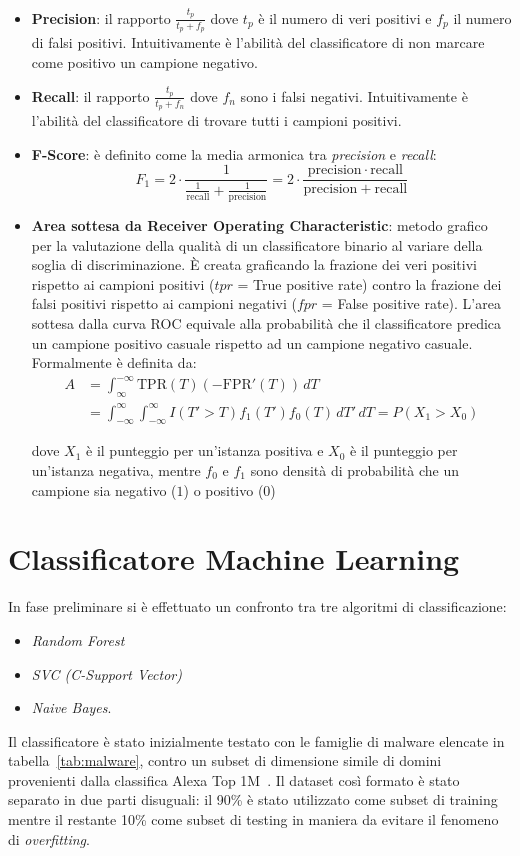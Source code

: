 \begin{itemize}
\item \textbf{Precision}: il rapporto $\frac{t_p}{t_p+f_p}$ dove $t_p$ è il numero di veri positivi e $f_p$ il numero di falsi positivi. Intuitivamente è l'abilità del classificatore di non marcare come positivo un campione negativo.
\item \textbf{Recall}: il rapporto $\frac{t_p}{t_p+f_n}$  dove $f_n$ sono i falsi negativi. Intuitivamente è l'abilità del classificatore di trovare tutti i campioni positivi.
\item \textbf{F-Score}: è definito come la media armonica tra \textit{precision} e \textit{recall}: 
\[F_1 = 2 \cdot \frac{1}{\tfrac{1}{\mathrm{recall}} + \tfrac{1}{\mathrm{precision}}} = 2 \cdot \frac{\mathrm{precision} \cdot \mathrm{recall}}{\mathrm{precision} + \mathrm{recall}}\]
\item \textbf{Area sottesa da Receiver Operating Characteristic}:  metodo grafico per la valutazione della qualità di un classificatore binario al variare della soglia di discriminazione. \`E creata graficando la frazione dei veri positivi rispetto ai campioni positivi ($tpr$ = True positive rate) contro la frazione dei falsi positivi rispetto ai campioni negativi ($fpr$ = False positive rate). L'area sottesa dalla curva ROC equivale alla probabilità che il classificatore predica un campione positivo casuale rispetto ad un campione negativo casuale. Formalmente è definita da:
\begin{align*}
A & = \int_{\infty}^{-\infty} \mbox{TPR}(T) \left(-\mbox{FPR}'(T)\right) \, dT \\
& = \int_{-\infty}^{\infty} \int_{-\infty}^{\infty} I(T'>T)f_1(T') f_0(T) \, dT' \, dT = P(X_1 > X_0)
\end{align*}

dove 
$X_{1}$ è il punteggio per un'istanza positiva e $X_{0}$ è il punteggio per un'istanza negativa, mentre $f_{0}$ e $f_{1}$ sono densità di probabilità che un campione sia negativo ($1$) o positivo ($0$)
\end{itemize}

\newpage
\section{Classificatore Machine Learning}
\label{res:crf}
In fase preliminare si è effettuato un confronto tra tre algoritmi di classificazione: 
\begin{itemize}
\item \textit{Random Forest}
\item \textit{SVC (C-Support Vector)}
\item \textit{Naive Bayes}. 
\end{itemize}
Il classificatore è stato inizialmente testato con le famiglie di malware elencate in tabella~\ref{tab:malware}, contro un subset di dimensione simile di domini provenienti dalla classifica Alexa Top 1M~\cite{amazon:alexa}. Il dataset così formato è stato separato in due parti disuguali: il 90\% è stato utilizzato come subset di training mentre il restante 10\% come subset di testing in maniera da evitare il fenomeno di \textit{overfitting}. 


